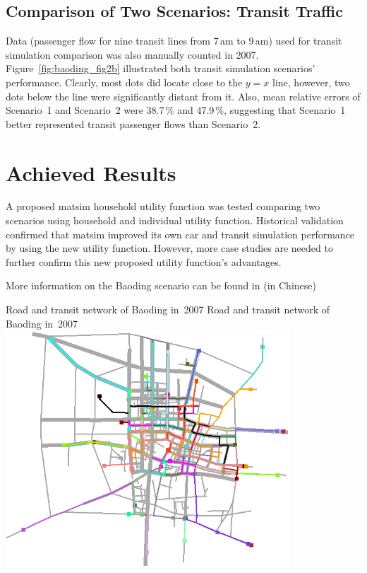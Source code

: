 \subsection{Comparison of Two Scenarios: Transit Traffic}
Data (passenger flow for nine transit lines from 7\,am to 9\,am) used for transit simulation comparison was also manually counted in 2007. Figure~\ref{fig:baoding_fig2b} illustrated both transit simulation scenarios' performance. 
Clearly, most dots did locate close to the $y=x$ line, however, two dots below the line were significantly distant from it. 
Also, mean relative errors of Scenario~1 and Scenario~2 were 38.7\,\% and 47.9\,\%, suggesting 
that Scenario~1 better represented transit passenger flows than Scenario~2. 

\section{Achieved Results}
A proposed \gls{matsim} household utility function was tested comparing two scenarios using household and individual utility function. Historical validation confirmed that \gls{matsim} improved its own car and transit simulation performance by using the new utility function. 
However, more case studies are needed to further confirm this new proposed utility function's advantages.

More information on the Baoding scenario can be found in \citet[][]{Zhuge_PhDThesis_2014} (in Chinese) 

\createfigure%
{Road and transit network of Baoding in~2007}%
{Road and transit network of Baoding in~2007}%
{\label{fig:baoding_fig1}}%
{\includegraphics[width=0.8\textwidth, angle=0]{scenarios/figures/baoding_fig1.png}}%
{}

